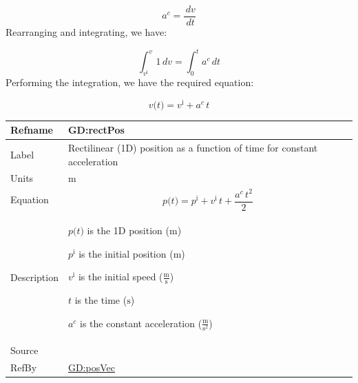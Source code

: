 \documentclass[12pt]{article}
\begin{document}
\begin{displaymath}
{a^{c}}=\frac{\,dv}{\,dt}
\end{displaymath}
Rearranging and integrating, we have:

\begin{displaymath}
\int_{{v^{\text{i}}}}^{v}{1}\,dv=\int_{0}^{t}{{a^{c}}}\,dt
\end{displaymath}
Performing the integration, we have the required equation:

\begin{displaymath}
v\text{(}t\text{)}={v^{\text{i}}}+{a^{c}}\,t
\end{displaymath}
\medskip
\noindent
\begin{minipage}{\textwidth}
\begin{tabular}{>{\raggedright}p{}>{\raggedright\arraybackslash}p{}}
\toprule \textbf{Refname} & \textbf{GD:rectPos}
\label{GD:rectPos}
\\ \midrule
Label & Rectilinear (1D) position as a function of time for constant acceleration
        
\\ \midrule
Units & ${\text{m}}$
        
\\ \midrule
Equation & \begin{displaymath}
           p\text{(}t\text{)}={p^{\text{i}}}+{v^{\text{i}}}\,t+\frac{{a^{c}}\,t^{2}}{2}
           \end{displaymath}
\\ \midrule
Description & \begin{symbDescription}
              \item{$p\text{(}t\text{)}$ is the 1D position (${\text{m}}$)}
              \item{${p^{\text{i}}}$ is the initial position (${\text{m}}$)}
              \item{${v^{\text{i}}}$ is the initial speed ($\frac{\text{m}}{\text{s}}$)}
              \item{$t$ is the time (${\text{s}}$)}
              \item{${a^{c}}$ is the constant acceleration ($\frac{\text{m}}{\text{s}^{2}}$)}
              \end{symbDescription}
\\ \midrule
Source & \cite[(pg. 8)]{hibbeler2004}
         
\\ \midrule
RefBy & \hyperref[GD:posVec]{GD:posVec}
        
\\ \bottomrule
\end{tabular}
\end{minipage}
\end{document}
